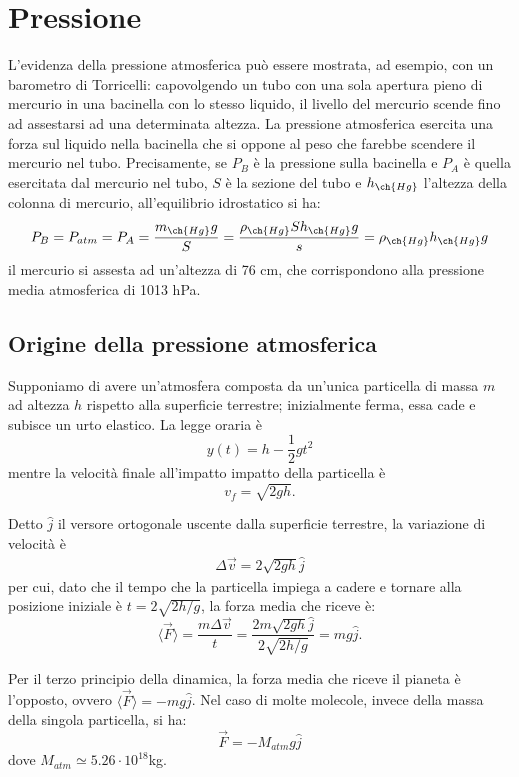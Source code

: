 \chapter{Pressione}
L'evidenza della pressione atmosferica può essere mostrata, ad esempio, con un barometro di Torricelli: capovolgendo un tubo con una sola apertura pieno di mercurio in una bacinella con lo stesso liquido, il livello del mercurio scende fino ad assestarsi ad una determinata altezza. La pressione atmosferica esercita una forza sul liquido nella bacinella che si oppone al peso che farebbe scendere il mercurio nel tubo. Precisamente, se $P_{B}$ è la pressione sulla bacinella e $P_{A}$ è quella esercitata dal mercurio nel tubo, $S$ è la sezione del tubo e $h_{\ch{Hg}}$ l'altezza della colonna di mercurio, all'equilibrio idrostatico si ha:
\begin{equation}
	P_{B}=P_{atm}=P_{A}=\frac{m_{\ch{Hg}}g}{S}=\frac{\rho_{\ch{Hg}} S h_{\ch{Hg}} g}{s}=\rho_{\ch{Hg}} h_{\ch{Hg}} g 
\end{equation}
il mercurio si assesta ad un'altezza di 76 cm, che corrispondono alla pressione media atmosferica di 1013 hPa.
\section{Origine della pressione atmosferica}
Supponiamo di avere un'atmosfera composta da un'unica particella di massa $m$ ad altezza $h$ rispetto alla superficie terrestre; inizialmente ferma, essa cade e subisce un urto elastico. La legge oraria è
\begin{equation}
	y(t)=h-\frac{1}{2}gt^2
\end{equation}
mentre la velocità finale all'impatto impatto della particella è
\begin{equation}
	v_f=\sqrt{2gh}.
\end{equation} 

Detto $\hat{j}$ il versore ortogonale uscente dalla superficie terrestre, la variazione di velocità è
\begin{align}
	\Delta \vec{v}=2\sqrt{2gh}\hat{j}
\end{align}
per cui, dato che il tempo che la particella impiega a cadere e tornare alla posizione iniziale è $t=2\sqrt{2h/g}$, la forza media che riceve è:
\begin{equation}
	\langle\vec{F}\rangle=\frac{m\Delta\vec{v}}{t}=\frac{2m\sqrt{2gh}\hat{j}}{2\sqrt{2h/g}}=mg\hat{j}.
\end{equation}

Per il terzo principio della dinamica, la forza media che riceve il pianeta è l'opposto, ovvero $\langle\vec{F}\rangle=-mg\hat{j}$. Nel caso di molte molecole, invece della massa della singola particella, si ha:
\begin{equation}
	\vec{F}=-M_{atm}g\hat{j}
\end{equation}
dove $M_{atm}\simeq 5.26 \cdot 10^{18}$kg.

